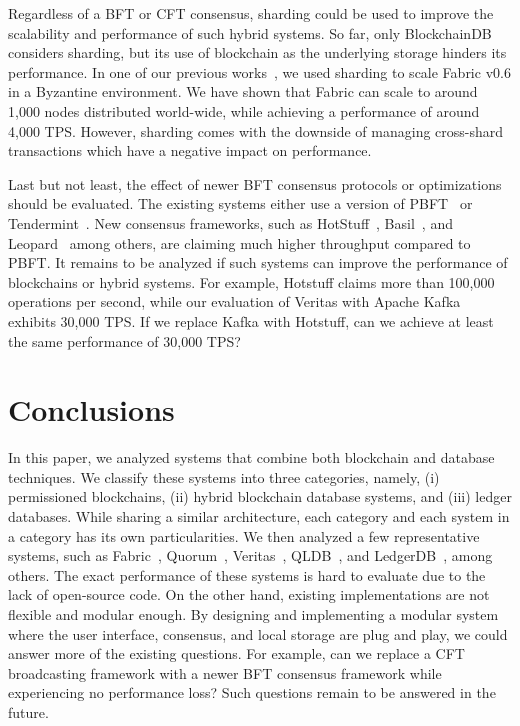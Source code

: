 \documentclass[11pt]{article}
\begin{document}
Regardless of a BFT or CFT consensus, sharding could be used to improve the scalability and performance of such hybrid systems. So far, only BlockchainDB considers sharding, but its use of blockchain as the underlying storage hinders its performance. In one of our previous works~\cite{anh_sigmod19}, we used sharding to scale Fabric v0.6 in a Byzantine environment. We have shown that Fabric can scale to around 1,000 nodes distributed world-wide, while achieving a performance of around 4,000 TPS. However, sharding comes with the downside of managing cross-shard transactions which have a negative impact on performance.

Last but not least, the effect of newer BFT consensus protocols or optimizations should be evaluated. The existing systems either use a version of PBFT~\cite{pbft} or Tendermint~\cite{tendermint_thesis}. New consensus frameworks, such as HotStuff~\cite{hotstuff}, Basil~\cite{basil}, and Leopard~\cite{leopard} among others, are claiming much higher throughput compared to PBFT. It remains to be analyzed if such systems can improve the performance of blockchains or hybrid systems. For example, Hotstuff claims more than 100,000 operations per second, while our evaluation of Veritas with Apache Kafka exhibits 30,000 TPS. If we replace Kafka with Hotstuff, can we achieve at least the same performance of 30,000 TPS?


\section{Conclusions}
\label{sec:concl}

In this paper, we analyzed systems that combine both blockchain and database techniques. We classify these systems into three categories, namely, (i) permissioned blockchains, (ii) hybrid blockchain database systems, and (iii) ledger databases. While sharing a similar architecture, each category and each system in a category has its own particularities. We then analyzed a few representative systems, such as Fabric~\cite{fabric}, Quorum~\cite{quorum_code}, Veritas~\cite{veritas_cidr19}, QLDB~\cite{qldb}, and LedgerDB~\cite{ledgerdb}, among others. The exact performance of these systems is hard to evaluate due to the lack of open-source code. On the other hand, existing implementations are not flexible and modular enough. By designing and implementing a modular system where the user interface, consensus, and local storage are plug and play, we could answer more of the existing questions. For example, can we replace a CFT broadcasting framework with a newer BFT consensus framework while experiencing no performance loss? Such questions remain to be answered in the future.
\end{document}
